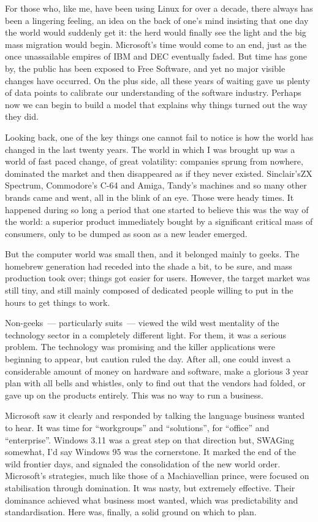 \documentclass{memoir}
\begin{document}
For those who, like me, have been using Linux for over a decade, there
always has been a lingering feeling, an idea on the back of one's mind
insisting that one day the world would suddenly get it: the herd would
finally see the light and the big mass migration would
begin. Microsoft's time would come to an end, just as the once
unassailable empires of IBM and DEC eventually faded. But time has
gone by, the public has been exposed to Free Software, and yet no
major visible changes have occurred. On the plus side, all these years
of waiting gave us plenty of data points to calibrate our
understanding of the software industry. Perhaps now we can begin to
build a model that explains why things turned out the way they did.

Looking back, one of the key things one cannot fail to notice is how
the world has changed in the last twenty years. The world in which I
was brought up was a world of fast paced change, of great volatility:
companies sprung from nowhere, dominated the market and then
disappeared as if they never existed. Sinclair'sZX Spectrum,
Commodore's C-64 and Amiga, Tandy's machines and so many other brands
came and went, all in the blink of an eye. Those were heady times. It
happened during so long a period that one started to believe this was
the way of the world: a superior product immediately bought by a
significant critical mass of consumers, only to be dumped as soon as a
new leader emerged.

But the computer world was small then, and it belonged mainly to
geeks. The homebrew generation had receded into the shade a bit, to be
sure, and mass production took over; things got easier for
users. However, the target market was still tiny, and still mainly
composed of dedicated people willing to put in the hours to get things
to work.

Non-geeks~--- particularly suits~--- viewed the wild west mentality of
the technology sector in a completely different light. For them, it
was a serious problem. The technology was promising and the killer
applications were beginning to appear, but caution ruled the
day. After all, one could invest a considerable amount of money on
hardware and software, make a glorious 3 year plan with all bells and
whistles, only to find out that the vendors had folded, or gave up on
the products entirely. This was no way to run a business.

Microsoft saw it clearly and responded by talking the language
business wanted to hear. It was time for ``workgroups'' and ``solutions'',
for ``office'' and ``enterprise''. Windows 3.11 was a great step on that
direction but, SWAGing somewhat, I'd say Windows 95 was the
cornerstone. It marked the end of the wild frontier days, and signaled
the consolidation of the new world order. Microsoft's strategies, much
like those of a Machiavellian prince, were focused on stabilisation
through domination. It was nasty, but extremely effective. Their
dominance achieved what business most wanted, which was predictability
and standardisation. Here was, finally, a solid ground on which to
plan.
\end{document}
